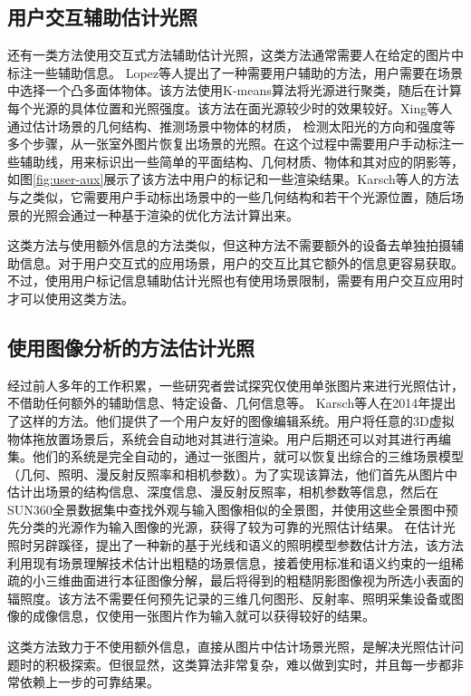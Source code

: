 \subsection{用户交互辅助估计光照}
还有一类方法使用交互式方法辅助估计光照，这类方法通常需要人在给定的图片中标注一些辅助信息。
Lopez等人\cite{lopez2010compositing}提出了一种需要用户辅助的方法，用户需要在场景中选择一个凸多面体物体。该方法使用K-means算法将光源进行聚类，随后在计算每个光源的具体位置和光照强度。该方法在面光源较少时的效果较好。Xing等人\cite{xing2013lighting}通过估计场景的几何结构、推测场景中物体的材质， 检测太阳光的方向和强度等多个步骤，从一张室外图片恢复出场景的光照。在这个过程中需要用户手动标注一些辅助线，用来标识出一些简单的平面结构、几何材质、物体和其对应的阴影等，如图\ref{fig:user-aux}展示了该方法中用户的标记和一些渲染结果。Karsch等人\cite{karsch2011rendering}的方法与之类似，它需要用户手动标出场景中的一些几何结构和若干个光源位置，随后场景的光照会通过一种基于渲染的优化方法计算出来。


这类方法与使用额外信息的方法类似，但这种方法不需要额外的设备去单独拍摄辅助信息。对于用户交互式的应用场景，用户的交互比其它额外的信息更容易获取。不过，使用用户标记信息辅助估计光照也有使用场景限制，需要有用户交互应用时才可以使用这类方法。
\subsection{使用图像分析的方法估计光照}
经过前人多年的工作积累，一些研究者尝试探究仅使用单张图片来进行光照估计，不借助任何额外的辅助信息、特定设备、几何信息等。
Karsch等人\cite{karsch2014automatic}在2014年提出了这样的方法。他们提供了一个用户友好的图像编辑系统。用户将任意的3D虚拟物体拖放置场景后，系统会自动地对其进行渲染。用户后期还可以对其进行再编集。他们的系统是完全自动的，通过一张图片，就可以恢复出综合的三维场景模型（几何、照明、漫反射反照率和相机参数）。为了实现该算法，他们首先从图片中估计出场景的结构信息、深度信息、漫反射反照率，相机参数等信息，然后在SUN360全景数据集\cite{xiao2012recognizing}中查找外观与输入图像相似的全景图，并使用这些全景图中预先分类的光源作为输入图像的光源，获得了较为可靠的光照估计结果。
\cite{chen2014lighting}在估计光照时另辟蹊径，提出了一种新的基于光线和语义的照明模型参数估计方法，该方法利用现有场景理解技术估计出粗糙的场景信息，接着使用标准和语义约束的一组稀疏的小三维曲面进行本征图像分解，最后将得到的粗糙阴影图像视为所选小表面的辐照度。该方法不需要任何预先记录的三维几何图形、反射率、照明采集设备或图像的成像信息，仅使用一张图片作为输入就可以获得较好的结果。

这类方法致力于不使用额外信息，直接从图片中估计场景光照，是解决光照估计问题时的积极探索。但很显然，这类算法非常复杂，难以做到实时，并且每一步都非常依赖上一步的可靠结果。
